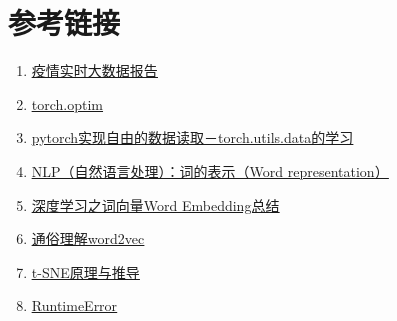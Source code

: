 \documentclass[12pt]{article}
\begin{document}
\section{参考链接}
\begin{enumerate}
\item \href{https://voice.baidu.com/act/newpneumonia/newpneumonia/?from=osari_aladin_banner}{\underline{疫情实时大数据报告}}
\item \href{https://blog.csdn.net/nineship/article/details/89228497}{\underline{torch.optim}}
\item \href{https://blog.csdn.net/tsq292978891/article/details/79414512}{\underline{pytorch实现自由的数据读取－torch.utils.data的学习}}
\item \href{https://blog.csdn.net/qq_35509823/article/details/104732544}{\underline{NLP（自然语言处理）：词的表示（Word representation）}}
\item \href{https://blog.csdn.net/qq_36774795/article/details/83755371}{\underline{深度学习之词向量Word Embedding总结}}
\item \href{https://www.jianshu.com/p/471d9bfbd72f}{\underline{通俗理解word2vec}}
\item \href{https://blog.csdn.net/scott198510/article/details/76099700}{\underline{t-SNE原理与推导}}
\item \href{https://blog.csdn.net/qq_35037684/article/details/108789737}{\underline{RuntimeError}}
\end{enumerate}
\end{document}
